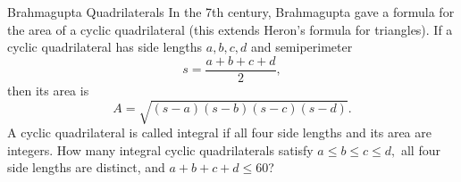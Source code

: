 \begin{problem}{Brahmagupta Quadrilaterals}
    In the 7th century, Brahmagupta gave a formula for the area of a cyclic quadrilateral (this extends Heron’s formula for triangles). If a cyclic quadrilateral has side lengths \(a,b,c,d\) and semiperimeter
    \[
    s=\frac{a+b+c+d}{2},
    \]
    then its area is
    \[
    A=\sqrt{(s-a)(s-b)(s-c)(s-d)}.
    \]
    A cyclic quadrilateral is called integral if all four side lengths and its area are integers. How many integral cyclic quadrilaterals satisfy \(a \le b \le c \le d,\) all four side lengths are distinct, and \(a+b+c+d \le 60\)?
\end{problem}
